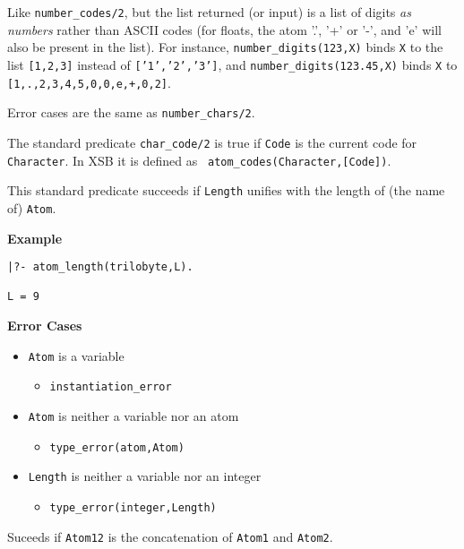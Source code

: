 \begin{description}
    Like \verb|number_codes/2|, but the list returned (or input) is a list of
    digits \emph{as numbers} rather than ASCII codes (for floats, the atom
    '.', '+' or '-', and 'e' will also be present in the list). For instance, 
    \verb|number_digits(123,X)| binds {\tt X} to the list {\tt [1,2,3]}
    instead of {\tt ['1','2','3']}, and \verb|number_digits(123.45,X)|
    binds {\tt X} to {\tt [1,.,2,3,4,5,0,0,e,+,0,2]}.

Error cases are the same as {\tt number\_chars/2}.

%
The standard predicate {\tt char\_code/2} is true if {\tt Code} is the
current code for {\tt Character}.  In XSB it is defined as {\tt
  atom\_codes(Character,[Code])}.

%
This standard predicate succeeds if {\tt Length} unifies with the
length of (the name of) {\tt Atom}.

{\bf Example}
{\small
\begin{verbatim}
|?- atom_length(trilobyte,L).

L = 9
\end{verbatim}
}

{\bf Error Cases}
\begin{itemize}
  \item {\tt Atom} is a variable
\begin{itemize}
\item {\tt instantiation\_error}
\end{itemize}
\item {\tt Atom} is neither a variable nor an atom
\begin{itemize}      
\item   {\tt type\_error(atom,Atom)}
\end{itemize}
\item {\tt Length} is neither a variable nor an integer
\begin{itemize}      
\item   {\tt type\_error(integer,Length)}
\end{itemize}
\end{itemize}

%
Suceeds if {\tt Atom12} is the concatenation of {\tt Atom1} and {\tt Atom2}.


\end{description}
